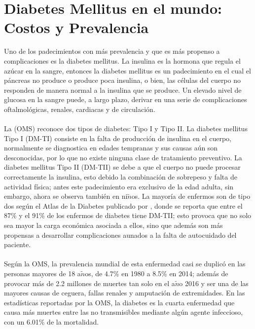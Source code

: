 \section{Diabetes Mellitus en el mundo: Costos y Prevalencia}
Uno de los padecimientos con m\'as prevalencia y que es m\'as propenso a complicaciones es la diabetes mellitus. La insulina es la hormona que regula el az\'ucar en la sangre, entonces la diabetes mellitus es un padecimiento en el cual el p\'ancreas no produce o produce poca insulina, o bien, las c\'elulas del cuerpo no responden de manera normal a la insulina que se produce. Un elevado nivel de glucosa en la sangre puede, a largo plazo, derivar en una serie de complicaciones oftalmol\'ogicas, renales, cardiacas y de circulaci\'on.\\
\\
La \cite{FactSheetDiabetes} %
 (OMS) reconoce dos tipos de diabetes: Tipo I y Tipo II. La diabetes mellitus Tipo I (DM-TI) consiste en la falta de producci\'on de insulina en el cuerpo, normalmente se diagnostica en edades tempranas y sus causas a\'un son desconocidas, por lo que no existe ninguna clase de tratamiento preventivo. La diabetes mellitus Tipo II (DM-TII) se debe a que el cuerpo no puede procesar correctamente la insulina, esto debido la combinaci\'on de sobrepeso y falta de actividad f\'isica; antes este padecimiento era exclusivo de la edad adulta, sin embargo, ahora se observa tambi\'en en ni$\tilde{n}$os. La mayor\'ia de enfermos son de tipo dos seg\'un el Atlas de la Diabetes publicado por \cite{atlas2015international}, donde se reporta que entre el 87\% y el 91\% de los enfermos de diabetes tiene DM-TII; esto provoca que no solo sea mayor la carga econ\'omica asociada a ellos, sino que adem\'as son m\'as propensas a desarrollar complicaciones  aunados a la falta de autocuidado del paciente.\\
\\
Seg\'un la OMS, la prevalencia mundial de esta enfermedad casi se duplic\'o en las personas mayores de 18 a$\tilde{n}$os, de 4.7\% en 1980 a 8.5\% en 2014; adem\'as de provocar m\'as de 2.2 millones de muertes tan solo en el a$\tilde{n}$o 2016 y ser una de las mayores causas de ceguera, fallas renales y amputaci\'on de extremidades. En las estad\'isticas reportadas por la OMS, la diabetes es la cuarta enfermedad que causa m\'as muertes entre las no transmisibles mediante alg\'un agente infeccioso, con un 6.01\% de la mortalidad.\\
\\

